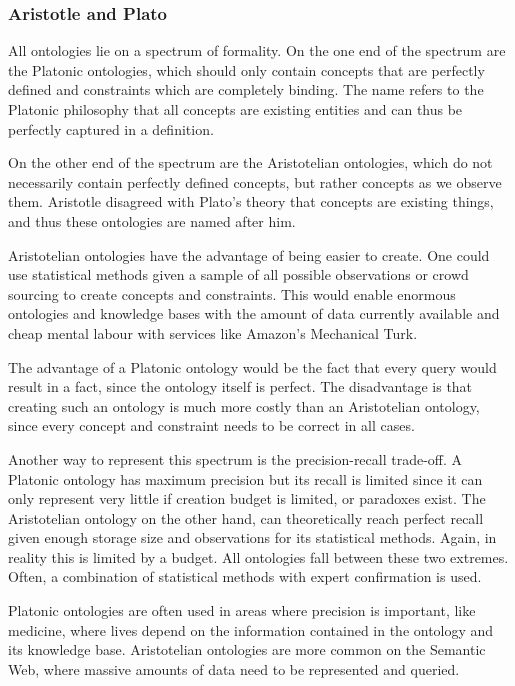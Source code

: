 \documentclass{article}
\begin{document}
 \subsubsection{Aristotle and Plato}
 All ontologies lie on a spectrum of formality. On the one end of the spectrum are the Platonic ontologies, which should only contain concepts that are perfectly defined and constraints which are completely binding. The name refers to the Platonic philosophy that all concepts are existing entities and can thus be perfectly captured in a definition.
 
 On the other end of the spectrum are the Aristotelian ontologies, which do not necessarily contain perfectly defined concepts, but rather concepts as we observe them. Aristotle disagreed with Plato's theory that concepts are existing things, and thus these ontologies are named after him.
 
 Aristotelian ontologies have the advantage of being easier to create. One could use statistical methods given a sample of all possible observations or crowd sourcing to create concepts and constraints. This would enable enormous ontologies and knowledge bases with the amount of data currently available and cheap mental labour with services like Amazon's Mechanical Turk.
 
 The advantage of a Platonic ontology would be the fact that every query would result in a fact, since the ontology itself is perfect. The disadvantage is that creating such an ontology is much more costly than an Aristotelian ontology, since every concept and constraint needs to be correct in all cases.
 
 Another way to represent this spectrum is the precision-recall trade-off. A Platonic ontology has maximum precision but its recall is limited since it can only represent very little if creation budget is limited, or paradoxes exist. The Aristotelian ontology on the other hand, can theoretically reach perfect recall given enough storage size and observations for its statistical methods. Again, in reality this is limited by a budget. All ontologies fall between these two extremes. Often, a combination of statistical methods with expert confirmation is used.
 
 Platonic ontologies are often used in areas where precision is important, like medicine, where lives depend on the information contained in the ontology and its knowledge base. Aristotelian ontologies are more common on the Semantic Web, where massive amounts of data need to be represented and queried.
\end{document}
